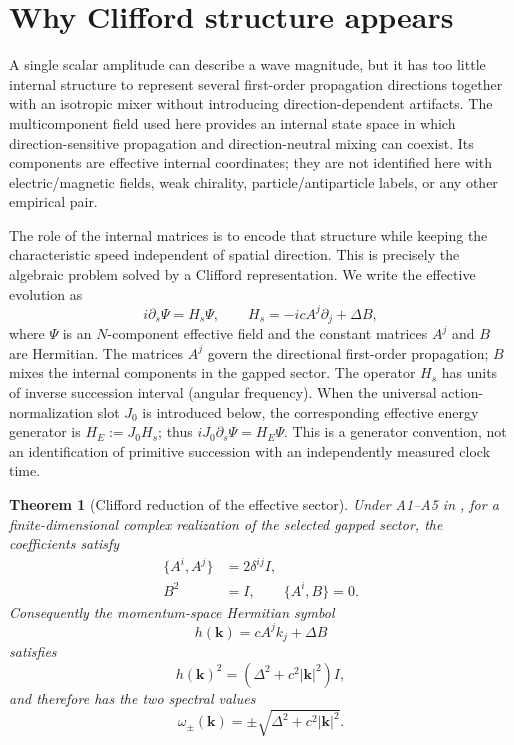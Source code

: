 \documentclass[11pt]{article}
\newtheorem{theorem}{Theorem}[section]
\theoremstyle{definition}
\begin{document}
\section{Why Clifford structure appears}
\label{sec:clifford}

A single scalar amplitude can describe a wave magnitude, but it has too little internal
structure to represent several first-order propagation directions together with an isotropic
mixer without introducing direction-dependent artifacts.  The multicomponent field used here
provides an internal state space in which direction-sensitive propagation and direction-neutral
mixing can coexist.  Its components are effective internal coordinates; they are not identified
here with electric/magnetic fields, weak chirality, particle/antiparticle labels, or any other
empirical pair.

The role of the internal matrices is to encode that structure while keeping the characteristic
speed independent of spatial direction.  This is precisely the algebraic problem solved by a
Clifford representation.  We write the effective evolution as
\begin{equation}
 i\partial_s\Psi=H_s\Psi,
 \qquad
 H_s=-icA^j\partial_j+\Delta B,
 \label{eq:firstorder}
\end{equation}
where $\Psi$ is an $N$-component effective field and the constant matrices $A^j$ and $B$ are
Hermitian.  The matrices $A^j$ govern the directional first-order propagation; $B$ mixes the
internal components in the gapped sector.  The operator $H_s$ has units of inverse
succession interval (angular frequency).  When the universal action-normalization slot
$J_0$ is introduced below, the corresponding effective energy generator is
$H_E:=J_0H_s$; thus $iJ_0\partial_s\Psi=H_E\Psi$.  This is a generator convention,
not an identification of primitive succession with an independently measured clock time.

\begin{theorem}[Clifford reduction of the effective sector]
\label{thm:clifford}
Under A1--A5 in , for a finite-dimensional complex
realization of the selected gapped sector, the coefficients satisfy
\begin{align}
 \{A^i,A^j\}&=2\delta^{ij}I,\label{eq:cliffA}\\
 B^2&=I,\qquad \{A^i,B\}=0.\label{eq:cliffB}
\end{align}
Consequently the momentum-space Hermitian symbol
\begin{equation}
 h(\mathbf k)=cA^j k_j+\Delta B
\end{equation}
satisfies
\begin{equation}
 \boxed{h(\mathbf k)^2=(\Delta^2+c^2|\mathbf k|^2)I},
 \label{eq:squaresymbol}
\end{equation}
and therefore has the two spectral values
\begin{equation}
 \boxed{\omega_\pm(\mathbf k)=\pm\sqrt{\Delta^2+c^2|\mathbf k|^2}}.
 \label{eq:dispersion}
\end{equation}
\end{theorem}
\end{document}
